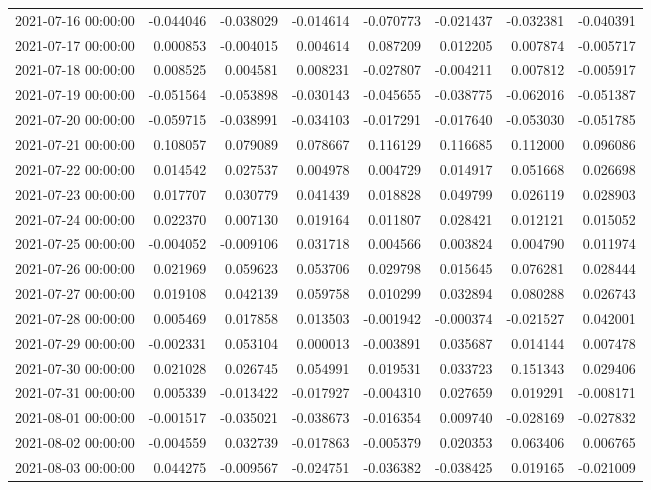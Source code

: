 \begin{tabular}{lrrrrrrr}
2021-07-16 00:00:00 & -0.044046 & -0.038029 & -0.014614 & -0.070773 & -0.021437 & -0.032381 & -0.040391 \\
2021-07-17 00:00:00 & 0.000853 & -0.004015 & 0.004614 & 0.087209 & 0.012205 & 0.007874 & -0.005717 \\
2021-07-18 00:00:00 & 0.008525 & 0.004581 & 0.008231 & -0.027807 & -0.004211 & 0.007812 & -0.005917 \\
2021-07-19 00:00:00 & -0.051564 & -0.053898 & -0.030143 & -0.045655 & -0.038775 & -0.062016 & -0.051387 \\
2021-07-20 00:00:00 & -0.059715 & -0.038991 & -0.034103 & -0.017291 & -0.017640 & -0.053030 & -0.051785 \\
2021-07-21 00:00:00 & 0.108057 & 0.079089 & 0.078667 & 0.116129 & 0.116685 & 0.112000 & 0.096086 \\
2021-07-22 00:00:00 & 0.014542 & 0.027537 & 0.004978 & 0.004729 & 0.014917 & 0.051668 & 0.026698 \\
2021-07-23 00:00:00 & 0.017707 & 0.030779 & 0.041439 & 0.018828 & 0.049799 & 0.026119 & 0.028903 \\
2021-07-24 00:00:00 & 0.022370 & 0.007130 & 0.019164 & 0.011807 & 0.028421 & 0.012121 & 0.015052 \\
2021-07-25 00:00:00 & -0.004052 & -0.009106 & 0.031718 & 0.004566 & 0.003824 & 0.004790 & 0.011974 \\
2021-07-26 00:00:00 & 0.021969 & 0.059623 & 0.053706 & 0.029798 & 0.015645 & 0.076281 & 0.028444 \\
2021-07-27 00:00:00 & 0.019108 & 0.042139 & 0.059758 & 0.010299 & 0.032894 & 0.080288 & 0.026743 \\
2021-07-28 00:00:00 & 0.005469 & 0.017858 & 0.013503 & -0.001942 & -0.000374 & -0.021527 & 0.042001 \\
2021-07-29 00:00:00 & -0.002331 & 0.053104 & 0.000013 & -0.003891 & 0.035687 & 0.014144 & 0.007478 \\
2021-07-30 00:00:00 & 0.021028 & 0.026745 & 0.054991 & 0.019531 & 0.033723 & 0.151343 & 0.029406 \\
2021-07-31 00:00:00 & 0.005339 & -0.013422 & -0.017927 & -0.004310 & 0.027659 & 0.019291 & -0.008171 \\
2021-08-01 00:00:00 & -0.001517 & -0.035021 & -0.038673 & -0.016354 & 0.009740 & -0.028169 & -0.027832 \\
2021-08-02 00:00:00 & -0.004559 & 0.032739 & -0.017863 & -0.005379 & 0.020353 & 0.063406 & 0.006765 \\
2021-08-03 00:00:00 & 0.044275 & -0.009567 & -0.024751 & -0.036382 & -0.038425 & 0.019165 & -0.021009 \\

\end{tabular}
